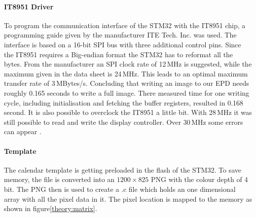 \paragraph{IT8951 Driver}
To program the communication interface of the STM32 with the IT8951 chip, a programming guide given by the manufacturer ITE Tech. Inc. was used. The interface is based on a 16-bit SPI bus with three additional control pins. Since the IT8951 requires a Big-endian format the STM32 has to reformat all the bytes. From the manufacturer an SPI clock rate of 12\,MHz is suggested, while the maximum given in the data sheet is 24\,MHz. This leads to an optimal maximum transfer rate of 3\,MBytes/s. Concluding that writing an image to our EPD needs roughly 0.165 seconds to write a full image. There measured time for one writing cycle, including initialisation and fetching the buffer registers, resulted in 0.168\,second. It is also possible to overclock the IT8951 a little bit. With 28\,MHz it was still possible to read and write the display controller. Over 30\,MHz some errors can appear \cite{IT8951}.      

   
\paragraph{Template}
The calendar template is getting preloaded in the flash of the STM32. To save memory, the file is converted into an $1200 \times 825$ PNG with the colour depth of 4 bit. The PNG then is used to create a .c file which holds an one dimensional array with all the pixel data in it. The pixel location is mapped to the memory as shown in figure\ref{theory:matrix}. 

